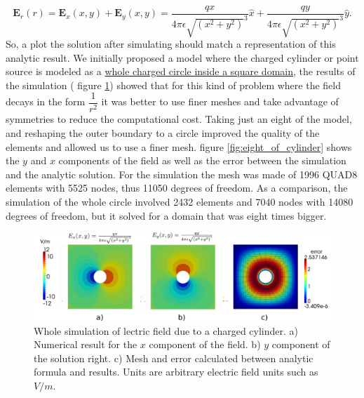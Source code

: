 \begin{equation}
\mathbf{E}_r(r) = \mathbf{E}_x(x,y) + \mathbf{E}_y(x,y) = \frac{qx}{4\pi \epsilon \sqrt{\left(x^2+y^2\right)}^3} \hat{x}+\frac{qy}{4\pi \epsilon \sqrt{\left(x^2+y^2\right)}^3} \hat{y}.
\end{equation}
So, a plot  the solution after simulating should match a representation of this analytic result. We initially proposed a model where the charged cylinder or point source is modeled as a \href{https://github.com/bebopsan/peyeQM/tree/
Depuration/Lib/OOPyQM/Examples/Whole\%20cylinder}{whole charged circle inside a square domain}, the results of the simulation ( figure \ref{fig:whole_cylinder}) showed that for this kind of problem where the field decays in the form $\dfrac{1}{r^2}$ it was better to use finer meshes and take advantage of symmetries to reduce the computational cost. 
Taking just an eight of the model, and reshaping the outer boundary to a circle improved the quality of the elements and allowed us to use a finer mesh. figure \ref{fig:eight_of_cylinder} shows the $y$ and $x$ components of the field as well as the error between the simulation and the analytic solution.
For the simulation the mesh was made of 1996 QUAD8 elements with 5525 nodes, thus 11050 degrees of freedom. As a comparison, the simulation of the whole circle involved 2432 elements and 7040 nodes with 14080 degrees of freedom, but it solved for a domain that was eight times bigger.


\begin{figure}
\centering
\includegraphics[scale=0.2]{./img/charged_cylinder_inside_rectangle.pdf}
\caption{Whole simulation of lectric field due to a charged cylinder. a) Numerical result for the $x$ component of the field. b) $y$ component of the solution right. c) Mesh and error calculated between analytic formula and results. Units are arbitrary electric field units such as $V/m$.}
\label{fig:whole_cylinder}
\end{figure}
 
